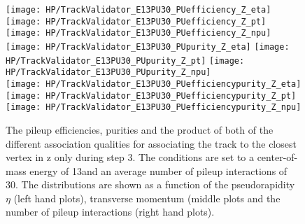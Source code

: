 \begin{figure}[Ht]
    \centering
    \texttt{[image: HP/TrackValidator\_E13PU30\_PUefficiency\_Z\_eta]}
    \texttt{[image: HP/TrackValidator\_E13PU30\_PUefficiency\_Z\_pt]}
    \texttt{[image: HP/TrackValidator\_E13PU30\_PUefficiency\_Z\_npu]}
    \\
    \texttt{[image: HP/TrackValidator\_E13PU30\_PUpurity\_Z\_eta]}
    \texttt{[image: HP/TrackValidator\_E13PU30\_PUpurity\_Z\_pt]}
    \texttt{[image: HP/TrackValidator\_E13PU30\_PUpurity\_Z\_npu]}
    \\
    \texttt{[image: HP/TrackValidator\_E13PU30\_PUefficiencypurity\_Z\_eta]}
    \texttt{[image: HP/TrackValidator\_E13PU30\_PUefficiencypurity\_Z\_pt]}
    \texttt{[image: HP/TrackValidator\_E13PU30\_PUefficiencypurity\_Z\_npu]}
    \caption[Pileup efficiencies, purities and their product of the different qualities of the association map with associating the track to the closest vertex in z only during step 3 with 13\TeV and $\left<PU\right>=30$]{The pileup efficiencies, purities and the product of both of the different association qualities for associating the track to the closest vertex in z only during step 3. The conditions are set to a center-of-mass energy of 13\TeV and an average number of pileup interactions of 30. The distributions are shown as a function of the pseudorapidity $\eta$ (left hand plots), transverse momentum (middle plots and the number of pileup interactions (right hand plots). \label{plot:HPUTAE13PU30ZtomumuQualPUZ}}
\end{figure}

